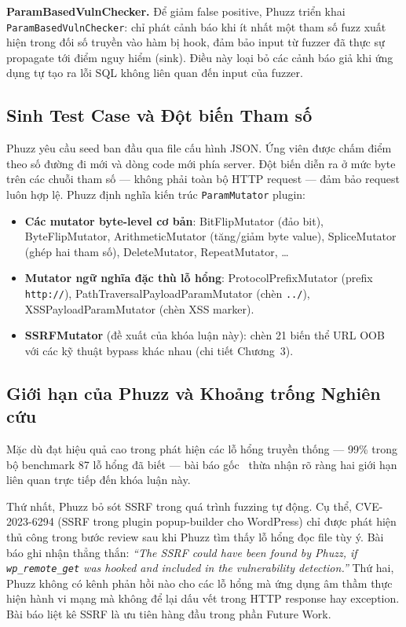 \textbf{ParamBasedVulnChecker.} Để giảm false positive, Phuzz triển khai
\texttt{ParamBasedVulnChecker}: chỉ phát cảnh báo khi ít nhất một tham số
fuzz xuất hiện trong đối số truyền vào hàm bị hook, đảm bảo input từ fuzzer
đã thực sự propagate tới điểm nguy hiểm (sink). Điều này loại bỏ các cảnh
báo giả khi ứng dụng tự tạo ra lỗi SQL không liên quan đến input của fuzzer.

\subsection{Sinh Test Case và Đột biến Tham số}

Phuzz yêu cầu seed ban đầu qua file cấu hình JSON. Ứng viên được chấm điểm
theo số đường đi mới và dòng code mới phía server. Đột biến diễn ra ở mức
byte trên các chuỗi tham số --- không phải toàn bộ HTTP request --- đảm bảo
request luôn hợp lệ. Phuzz định nghĩa kiến trúc \texttt{ParamMutator} plugin:

\begin{itemize}
    \item \textbf{Các mutator byte-level cơ bản}: BitFlipMutator (đảo bit),
    ByteFlipMutator, ArithmeticMutator (tăng/giảm byte value), SpliceMutator
    (ghép hai tham số), DeleteMutator, RepeatMutator, \ldots
    \item \textbf{Mutator ngữ nghĩa đặc thù lỗ hổng}: ProtocolPrefixMutator
    (prefix \texttt{http://}), PathTraversalPayloadParamMutator (chèn
    \texttt{../}), XSSPayloadParamMutator (chèn XSS marker).
    \item \textbf{SSRFMutator} (đề xuất của khóa luận này): chèn 21 biến thể
    URL OOB với các kỹ thuật bypass khác nhau (chi tiết Chương~3).
\end{itemize}

\subsection{Giới hạn của Phuzz và Khoảng trống Nghiên cứu}

Mặc dù đạt hiệu quả cao trong phát hiện các lỗ hổng truyền thống --- 99\%
trong bộ benchmark 87 lỗ hổng đã biết --- bài báo gốc~\cite{neef2024phuzz}
thừa nhận rõ ràng hai giới hạn liên quan trực tiếp đến khóa luận này.

Thứ nhất, Phuzz bỏ sót SSRF trong quá trình fuzzing tự động. Cụ thể,
CVE-2023-6294 (SSRF trong plugin popup-builder cho WordPress) chỉ được phát
hiện thủ công trong bước review sau khi Phuzz tìm thấy lỗ hổng đọc file tùy
ý. Bài báo ghi nhận thẳng thắn: \textit{``The SSRF could have been found by
Phuzz, if \texttt{wp\_remote\_get} was hooked and included in the vulnerability
detection.''} Thứ hai, Phuzz không có kênh phản hồi nào cho các lỗ hổng mà
ứng dụng âm thầm thực hiện hành vi mạng mà không để lại dấu vết trong HTTP
response hay exception. Bài báo liệt kê SSRF là ưu tiên hàng đầu trong phần
Future Work.

